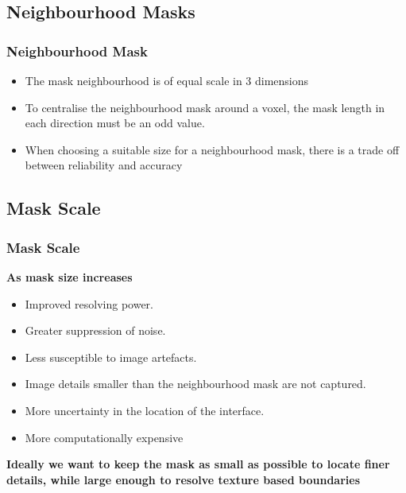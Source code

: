 \documentclass[9pt]{beamer}
\begin{document}
\subsection{Neighbourhood Masks}
	\begin{frame}
			\frametitle{Neighbourhood Mask}

				\begin{itemize}
			
					\item The mask neighbourhood is of equal scale in 3 dimensions
					\item To centralise the neighbourhood mask around a voxel, the mask length in each direction must be an odd value.
					\item When choosing a suitable size for a neighbourhood mask, there is a trade off between reliability and accuracy
				\end{itemize}	
				
	\end{frame}	
	
	\subsection{Mask Scale}
	\begin{frame}
			\frametitle{Mask Scale}		
						\begin{block}{\textbf{As mask size increases}	}
						
								\begin{itemize}
									\item Improved resolving power.
									\item Greater suppression of noise.
									\item Less susceptible to image artefacts.
									\item Image details smaller than the neighbourhood mask are not captured.
									\item More uncertainty in the location of the interface.
									\item More computationally expensive
								\end{itemize}
						\end{block}
						\textbf{Ideally we want to keep the mask as small as possible to locate finer details, while large enough to resolve texture based boundaries}				



	\end{frame}
\end{document}
